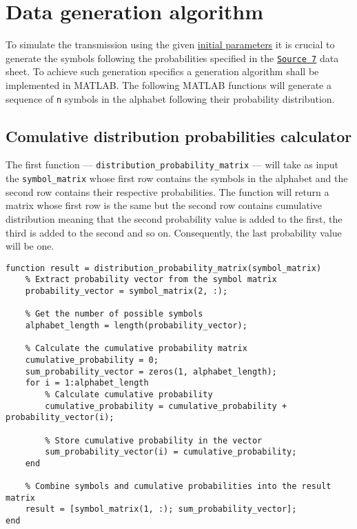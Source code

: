 \section{Data generation algorithm}
To simulate the transmission using the given \hyperref[initial-parameters]{initial parameters} it is crucial to generate the symbols following the probabilities specified in the \hyperref[tab:source7]{\texttt{Source 7}} data sheet. To achieve such generation specifics a generation algorithm shall be implemented in MATLAB. The following MATLAB functions will generate a sequence of \texttt{n} symbols in the alphabet following their probability distribution.  

\subsection{Comulative distribution probabilities calculator}
The first function — \texttt{distribution\_probability\_matrix} — will take as input the \texttt{symbol\_matrix} whose first row contains the symbols in the alphabet and the second row contains their respective probabilities. The function will return a matrix whose first row is the same but the second row contains cumulative distribution meaning that the second probability value is added to the first, the third is added to the second and so on. Consequently, the last probability value will be one.

\begin{lstlisting}
function result = distribution_probability_matrix(symbol_matrix)
    % Extract probability vector from the symbol matrix
    probability_vector = symbol_matrix(2, :);
    
    % Get the number of possible symbols
    alphabet_length = length(probability_vector);

    % Calculate the cumulative probability matrix
    cumulative_probability = 0;
    sum_probability_vector = zeros(1, alphabet_length);
    for i = 1:alphabet_length
        % Calculate cumulative probability
        cumulative_probability = cumulative_probability + probability_vector(i);
        
        % Store cumulative probability in the vector
        sum_probability_vector(i) = cumulative_probability;
    end

    % Combine symbols and cumulative probabilities into the result matrix
    result = [symbol_matrix(1, :); sum_probability_vector];
end
\end{lstlisting}

